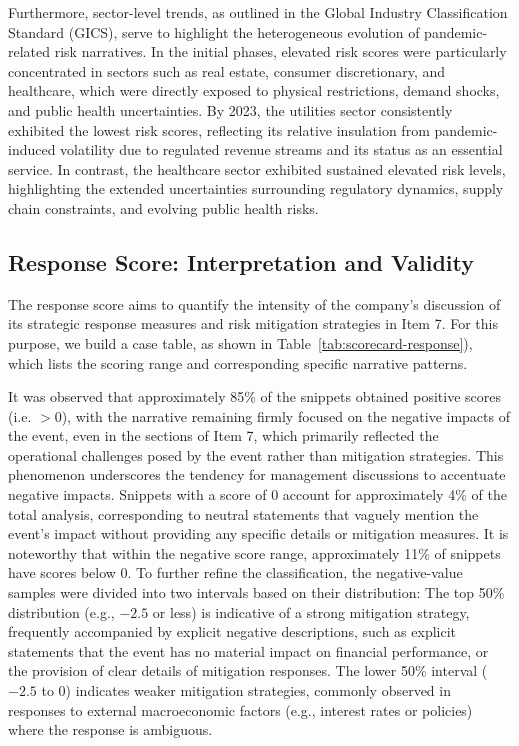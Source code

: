 \documentclass[sigconf]{acmart}
\begin{document}
Furthermore, sector-level trends, as outlined in the Global Industry Classification Standard (GICS), serve to highlight the heterogeneous evolution of pandemic-related risk narratives. In the initial phases, elevated risk scores were particularly concentrated in sectors such as real estate, consumer discretionary, and healthcare, which were directly exposed to physical restrictions, demand shocks, and public health uncertainties.
By 2023, the utilities sector consistently exhibited the lowest risk scores, reflecting its relative insulation from pandemic-induced volatility due to regulated revenue streams and its status as an essential service. In contrast, the healthcare sector exhibited sustained elevated risk levels, highlighting the extended uncertainties surrounding regulatory dynamics, supply chain constraints, and evolving public health risks.

\subsection{Response Score: Interpretation and Validity}

The response score aims to quantify the intensity of the company's discussion of its strategic response measures and risk mitigation strategies in Item 7. For this purpose, we build a case table, as shown in Table~\ref{tab:scorecard-response}), which lists the scoring range and corresponding specific narrative patterns.

It was observed that approximately 85\% of the snippets obtained positive scores (i.e. $>0$), with the narrative remaining firmly focused on the negative impacts of the event, even in the sections of Item 7, which primarily reflected the operational challenges posed by the event rather than mitigation strategies. 
This phenomenon underscores the tendency for management discussions to accentuate negative impacts. Snippets with a score of 0 account for approximately 4\% of the total analysis, corresponding to neutral statements that vaguely mention the event's impact without providing any specific details or mitigation measures.
It is noteworthy that within the negative score range, approximately 11\% of snippets have scores below 0. 
To further refine the classification, the negative-value samples were divided into two intervals based on their distribution: The top 50\% distribution (e.g., $-2.5$ or less) is indicative of a strong mitigation strategy, frequently accompanied by explicit negative descriptions, such as explicit statements that the event has no material impact on financial performance, or the provision of clear details of mitigation responses. 
The lower 50\% interval ($-2.5$ to $0$) indicates weaker mitigation strategies, commonly observed in responses to external macroeconomic factors (e.g., interest rates or policies) where the response is ambiguous.
\end{document}
